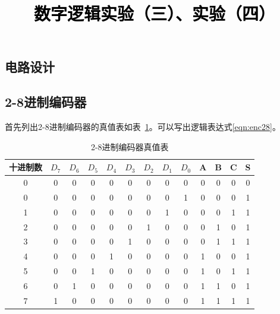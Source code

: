\documentclass[a4paper,twoside]{ctexart}
\newcommand{\PaperTitle}{数字逻辑实验（三）、实验（四）}  %
\begin{document}
\newpage

\title{
	\Large{\textcolor{black}{\PaperTitle}}
}
 
\newpage
\setcounter{page}{1}

\begin{spacing}{1.2}


\setcounter{section}{5}

\section{电路设计}

\subsection{2-8进制编码器}

首先列出2-8进制编码器的真值表如表~\ref{tbl:enc28}。可以写出逻辑表达式\eqref{eqn:enc28}。

\begin{table}[htbp]
	\centering
	\caption{2-8进制编码器真值表}
	\label{tbl:enc28}
	\begin{tabular}{c|cccccccc|ccc|c}
		\toprule
		\hline 
		十进制数&$D_7$&$D_6$&$D_5$&$D_4$&$D_3$&$D_2$&$D_1$&$D_0$&A&B&C&S \\
		\hline
		0&0&0&0&0&0&0&0&0&0&0&0&0 \\
		0&0&0&0&0&0&0&0&1&0&0&0&1 \\
		1&0&0&0&0&0&0&1&0&0&0&1&1 \\
		2&0&0&0&0&0&1&0&0&0&1&0&1 \\
		3&0&0&0&0&1&0&0&0&0&1&1&1 \\
		4&0&0&0&1&0&0&0&0&1&0&0&1 \\
		5&0&0&1&0&0&0&0&0&1&0&1&1 \\
		6&0&1&0&0&0&0&0&0&1&1&0&1 \\
		7&1&0&0&0&0&0&0&0&1&1&1&1 \\
		\hline
		\bottomrule
	\end{tabular}
\end{table}


\end{spacing}
\end{document}

